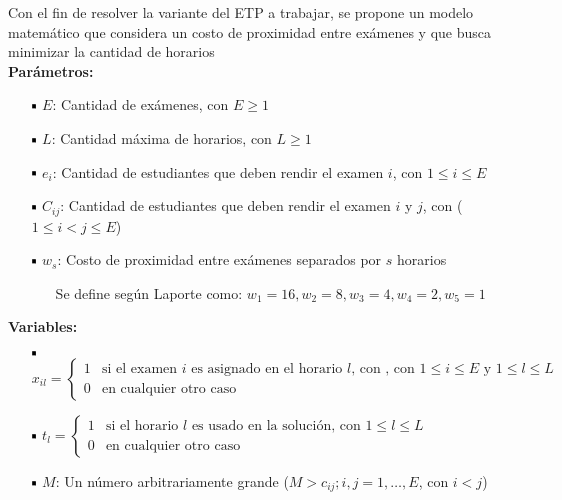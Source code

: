 \documentclass[letter, 10pt]{article}
\newcommand*\sq{\mathbin{\vcenter{\hbox{\rule{.7ex}{.7ex}}}}}
\begin{document}
Con el fin de resolver la variante del ETP a trabajar, se propone un modelo matemático que considera un costo de proximidad entre exámenes \cite{LAPORTE1984351} y que busca minimizar la cantidad de horarios \cite{WIJGERS}\\

\textbf{Parámetros:}

\begin{itemize}
	\item[$\sq$] $E$: Cantidad de exámenes, con $E \geq 1$
	\item[$\sq$] $L$: Cantidad máxima de horarios, con $L \geq 1$
	\item[$\sq$] $e_i$: Cantidad de estudiantes que deben rendir el examen $i$, con $1 \leq i \leq E$
	\item[$\sq$] $C_{ij}$: Cantidad de estudiantes que deben rendir el examen $i$ y $j$, con ($1 \leq i < j \leq E$)
	\item[$\sq$] $w_{s}$: Costo de proximidad entre exámenes separados por $s$ horarios
	\begin{itemize}
		\item[] Se define según Laporte \cite{LAPORTE1984351} como: $w_{1} = 16, w_{2} = 8, w_{3} = 4, w_{4} = 2, w_{5} = 1$ 
	\end{itemize}

\end{itemize}

\textbf{Variables:}
\begin{itemize}
	\item[$\sq$] $x_{il} =
					\left\{
						\begin{array}{ll}
							1  & \mbox{si el examen } i \text{ es asignado en el horario } l \text{, con } \text{, con } 1 \leq i \leq E \text{ y } 1 \leq l \leq L \\
							0 & \mbox{en cualquier otro caso}
						\end{array}
					\right.$
	\item[$\sq$] $t_{l} =
					\left\{
						\begin{array}{ll}
							1  & \mbox{si el horario } l \text{ es usado en la solución, con } 1 \leq l \leq L \\
							0 & \mbox{en cualquier otro caso}
						\end{array}
					\right.$

	\item[$\sq$] $M$: Un número arbitrariamente grande ($M > c_{ij}; i, j = 1, \ldots ,E$, con $i < j$)
\end{itemize}
\end{document}
